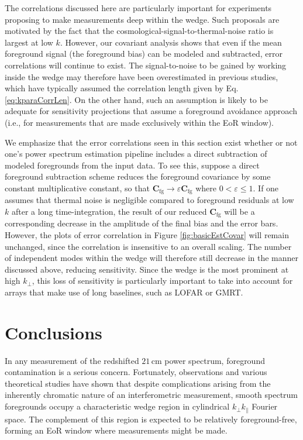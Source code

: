 \documentclass[twocolumn,aps,prd,nofootinbib,showpacs]{revtex4-1}
\begin{document}
The correlations discussed here are particularly important for experiments proposing to make measurements deep within the wedge.  Such proposals are motivated by the fact that the cosmological-signal-to-thermal-noise ratio is largest at low $k$.  However, our covariant analysis shows that even if the mean foreground signal (the foreground bias) can be modeled and subtracted, error correlations will continue to exist.  The signal-to-noise to be gained by working inside the wedge may therefore have been overestimated in previous studies, which have typically assumed the correlation length given by  Eq. \eqref{eq:kparaCorrLen}.  On the other hand, such an assumption is likely to be adequate for sensitivity projections that assume a foreground avoidance approach (i.e., for measurements that are made exclusively within the EoR window).

We emphasize that the error correlations seen in this section exist whether or not one's power spectrum estimation pipeline includes a direct subtraction of modeled foregrounds from the input data.  To see this, suppose a direct foreground subtraction scheme reduces the foreground covariance by some constant multiplicative constant, so that $\mathbf{C}_\textrm{fg} \rightarrow \varepsilon \mathbf{C}_\textrm{fg} $ where $0 < \varepsilon \le 1$.  If one assumes that thermal noise is negligible compared to foreground residuals at low $k$ after a long time-integration, the result of our reduced $\mathbf{C}_\textrm{fg}$ will be a corresponding decrease in the amplitude of the final bias and the error bars.  However, the plots of error correlation in Figure \ref{fig:basicEstCovar} will remain unchanged, since the correlation is insensitive to an overall scaling.  The number of independent modes within the wedge will therefore still decrease in the manner discussed above, reducing sensitivity.  Since the wedge is the most prominent at high $k_\perp$, this loss of sensitivity is particularly important to take into account for arrays that make use of long baselines, such as LOFAR or GMRT.

\section{Conclusions}
\label{sec:Conclusions}
In any measurement of the redshifted $21\,\textrm{cm}$ power spectrum, foreground contamination is a serious concern.  Fortunately, observations and various theoretical studies have shown that despite complications arising from the inherently chromatic nature of an interferometric measurement, smooth spectrum foregrounds occupy a characteristic wedge region in cylindrical $k_\perp k_\parallel$ Fourier space.  The complement of this region is expected to be relatively foreground-free, forming an EoR window where measurements might be made.
\end{document}
